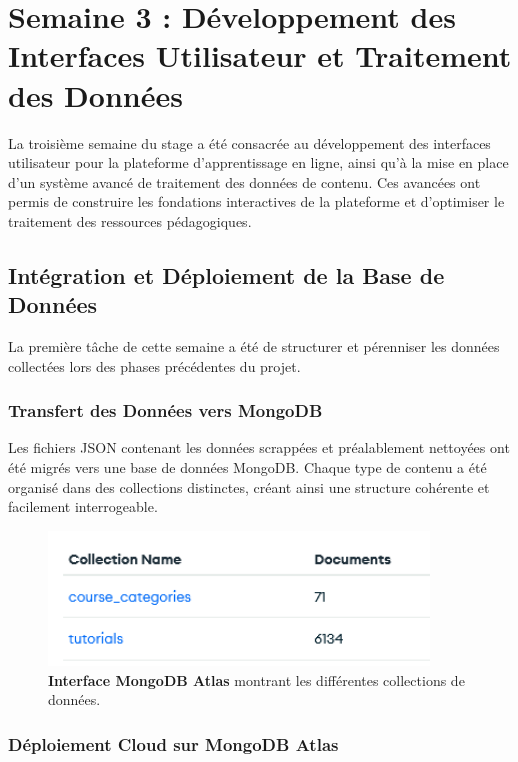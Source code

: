 \chapter{Semaine 3 : Développement des Interfaces Utilisateur et Traitement des Données}
\thispagestyle{fancy}

La troisième semaine du stage a été consacrée au développement des interfaces utilisateur pour la plateforme d'apprentissage en ligne, ainsi qu'à la mise en place d'un système avancé de traitement des données de contenu. Ces avancées ont permis de construire les fondations interactives de la plateforme et d'optimiser le traitement des ressources pédagogiques.

\section{Intégration et Déploiement de la Base de Données}

La première tâche de cette semaine a été de structurer et pérenniser les données collectées lors des phases précédentes du projet.

\subsection{Transfert des Données vers MongoDB}

Les fichiers JSON contenant les données scrappées et préalablement nettoyées ont été migrés vers une base de données MongoDB. Chaque type de contenu a été organisé dans des collections distinctes, créant ainsi une structure cohérente et facilement interrogeable.

\begin{figure}[h!]
  \centering
  \includegraphics[width=0.9\textwidth,keepaspectratio]{week_3_img/Screenshot 2025-05-19 234047.png}
  \caption{\textbf{Interface MongoDB Atlas} montrant les différentes collections de données.}
  \label{fig:mongodb_collections}
\end{figure}

\subsection{Déploiement Cloud sur MongoDB Atlas}

